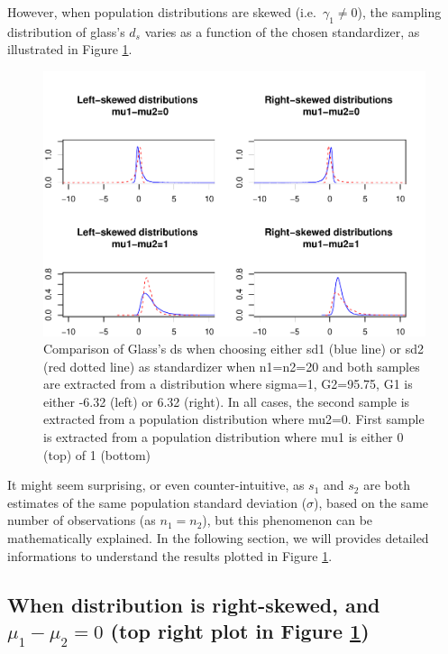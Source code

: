 \documentclass[
  man,floatsintext]{apa6}
\begin{document}
However, when population distributions are skewed (i.e.~\(\gamma_1 \neq 0\)), the sampling distribution of glass's \(d_s\) varies as a function of the chosen standardizer, as illustrated in Figure \ref{fig:glass2}.

\begin{figure}
\centering
\includegraphics{Mathematical-study-of-Glass-s-d_files/figure-latex/glass2-1.pdf}
\caption{\label{fig:glass2}Comparison of Glass's ds when choosing either sd1 (blue line) or sd2 (red dotted line) as standardizer when n1=n2=20 and both samples are extracted from a distribution where sigma=1, G2=95.75, G1 is either -6.32 (left) or 6.32 (right). In all cases, the second sample is extracted from a population distribution where mu2=0. First sample is extracted from a population distribution where mu1 is either 0 (top) of 1 (bottom)}
\end{figure}

It might seem surprising, or even counter-intuitive, as \(s_1\) and \(s_2\) are both estimates of the same population standard deviation (\(\sigma\)), based on the same number of observations (as \(n_1=n_2\)), but this phenomenon can be mathematically explained. In the following section, we will provides detailed informations to understand the results plotted in Figure \ref{fig:glass2}.

\hypertarget{when-distribution-is-right-skewed-and-mu_1-mu_20-top-right-plot-in-figure}{%
\subsection{\texorpdfstring{When distribution is right-skewed, and \textbf{\(\mu_1-\mu_2=0\)} (top right plot in Figure \ref{fig:glass2})}{When distribution is right-skewed, and \textbackslash mu\_1-\textbackslash mu\_2=0 (top right plot in Figure )}}\label{when-distribution-is-right-skewed-and-mu_1-mu_20-top-right-plot-in-figure}}
\end{document}
